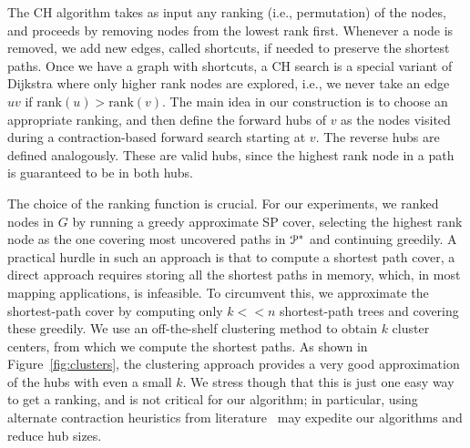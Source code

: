 The CH algorithm takes as input any ranking (i.e., permutation) of the nodes, and proceeds by removing nodes from the lowest rank first.
Whenever a node is removed, we add new edges, called shortcuts, if needed to preserve the shortest paths.
Once we have a graph with shortcuts, a CH search is a special variant of Dijkstra where only higher rank nodes are explored, i.e., we never take an edge $uv$ if rank$(u)>\text{rank}(v)$. 
The main idea in our construction is to choose an appropriate ranking, and then define the forward hubs of $v$ as the nodes visited during a contraction-based forward search starting at $v$.
The reverse hubs are defined analogously.
These are valid hubs, since the highest rank node in a path is guaranteed to be in both hubs.

The choice of the ranking function is crucial.
For our experiments, we ranked nodes in $G$ by running a greedy approximate SP cover, selecting the highest rank node as the one covering most uncovered paths in $\mathcal{P}^*$ and continuing greedily. 
A practical hurdle in such an approach is that to compute a shortest path cover, a direct approach requires storing all the shortest paths in memory, which, in most mapping applications, is infeasible.
To circumvent this, we approximate the shortest-path cover by computing only $k<<n$ shortest-path trees and covering these greedily.
We use an off-the-shelf clustering method to obtain $k$ cluster centers, from which we compute the shortest paths. 
As shown in Figure~\ref{fig:clusters}, the clustering approach provides a very good approximation of the hubs with even a small $k$.
We stress though that this is just one easy way to get a ranking, and is not critical for our algorithm; in particular, using alternate contraction heuristics from literature~\cite{goldberg_survey,rice_csp} may expedite our algorithms and reduce hub sizes.


